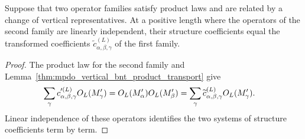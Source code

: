 \begin{lemma}%
    \label{thm:mpdo_vertical_bnt_coefficient_covariance_abstract}
    \leanok
    Suppose that two operator families satisfy product laws and are related
    by a change of vertical representatives. At a positive length where
    the operators of the second family are linearly independent, their
    structure coefficients equal the transformed coefficients
    $\widetilde c^{(L)}_{\alpha,\beta,\gamma}$ of the first family.
\end{lemma}
\begin{proof}\leanok
    The product law for the second family and
    Lemma~\ref{thm:mpdo_vertical_bnt_product_transport} give
    \begin{align}
        \sum_\gamma c'^{(L)}_{\alpha,\beta,\gamma}O_L(M'_\gamma)
         & =O_L(M'_\alpha)O_L(M'_\beta)
        =\sum_\gamma
        \widetilde c^{(L)}_{\alpha,\beta,\gamma}O_L(M'_\gamma).
        \notag
    \end{align}
    Linear independence of these operators identifies the two
    systems of structure coefficients term by term.
\end{proof}

